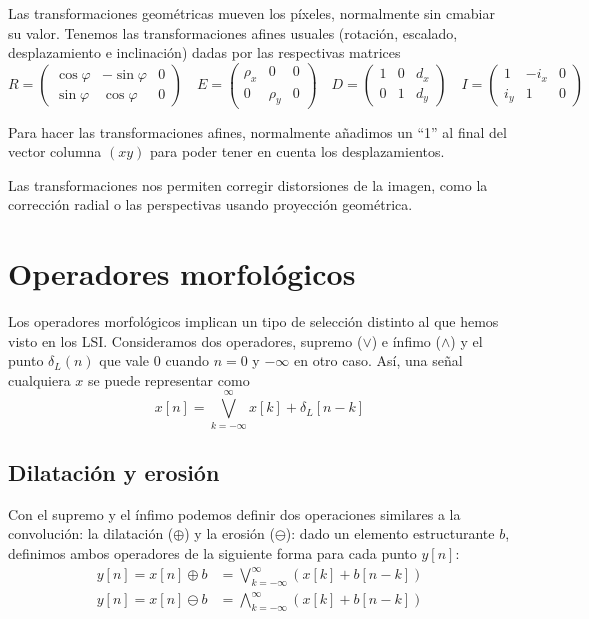 \documentclass[nochap,palatino,notitlepage]{apuntes}
\begin{document}
Las transformaciones geométricas mueven los píxeles, normalmente sin cmabiar su valor. Tenemos las transformaciones afines usuales (rotación, escalado, desplazamiento e inclinación) dadas por las respectivas matrices \[
R = \begin{pmatrix} \cos φ & - \sin φ & 0 \\ \sin φ & \cos φ & 0 \end{pmatrix}\quad
E = \begin{pmatrix} ρ_x & 0 & 0 \\ 0 & ρ_y & 0 \end{pmatrix} \quad
D = \begin{pmatrix} 1 & 0 & d_x \\ 0 &  1 & d_y \end{pmatrix} \quad
I = \begin{pmatrix} 1 & -i_x & 0 \\ i_y &  1 & 0 \end{pmatrix} \quad
\]

Para hacer las transformaciones afines, normalmente añadimos un ``1'' al final del vector columna $(x y)$ para poder tener en cuenta los desplazamientos.

Las transformaciones nos permiten corregir distorsiones de la imagen, como la corrección radial o las perspectivas usando proyección geométrica.

\section{Operadores morfológicos}


Los operadores morfológicos implican un tipo de selección distinto al que hemos visto en los LSI. Consideramos dos operadores, supremo ($\vee$) e ínfimo ($\wedge$) y el punto $δ_L(n)$ que vale $0$ cuando $n = 0$ y $- ∞$ en otro caso. Así, una señal cualquiera $x$ se puede representar como \[ x[n] = \bigvee_{k=-∞}^∞ x[k] + δ_L[n-k]\]

\subsection{Dilatación y erosión}

Con el supremo y el ínfimo podemos definir dos operaciones similares a la convolución: la dilatación ($\oplus$) y la erosión ($\ominus$): dado un elemento estructurante $b$, definimos ambos operadores de la siguiente forma para cada punto $y[n]$: \begin{align*}
y[n] = x[n] \oplus b &= \bigvee_{k=-∞}^∞ (x[k] + b[n-k]) \\
y[n] = x[n] \ominus b &= \bigwedge_{k=-∞}^∞ (x[k] + b[n-k])
\end{align*}
\end{document}
